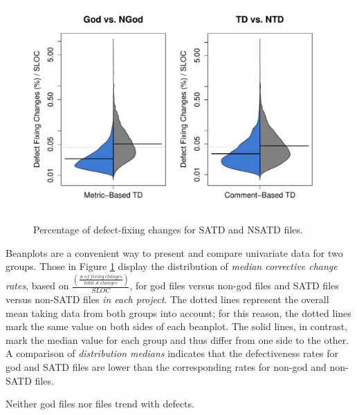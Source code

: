 

\begin{figure}[h]
	\centering
	\includegraphics[width=140mm]{figures/chapter4/rq1_defectivness_distrubution_new}
	\caption{Percentage of defect-fixing changes for SATD and NSATD files.}
	\label{figure:ch4_number_of_fixing_changes_TD_vs_NTD}
\end{figure}

Beanplots are a convenient way to present and compare univariate data for two groups. Those in Figure \ref{figure:ch4_number_of_fixing_changes_TD_vs_NTD} display the distribution of \textit{median corrective change rates}, based on $\frac{\left (\frac{\#~of~fixing~changes}{total~\#~changes} \right )}{SLOC}$, for god files versus non-god files and SATD files versus non-SATD files \textit{in each project}. %
The dotted lines represent the overall mean taking data from both groups into account; for this reason, the dotted lines mark the same value on both sides of each beanplot. The solid lines, in contrast, mark the median value for each group and thus differ from one side to the other. A comparison of \textit{distribution medians} indicates that the defectiveness rates for god and SATD files are lower than the corresponding rates for non-god and non-SATD files.

\begin{myboxii}
	Neither god files nor \SATD files trend with defects.
\end{myboxii}

